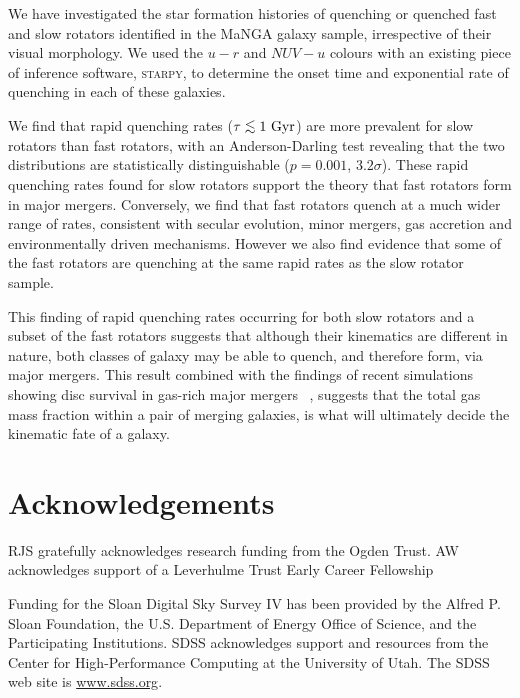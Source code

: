 \documentclass[useAMS,usenatbib]{mn2e}
\def\lesssim{\mathrel{\hbox{\rlap{\hbox{\lower3pt\hbox{$\sim$}}}\hbox{\raise2pt\hbox{$<$}}}}}
\begin{document}
We have investigated the star formation histories of quenching or quenched fast and slow rotators identified in the MaNGA galaxy sample, irrespective of their visual morphology. We used the $u-r$ and $NUV-u$ colours with an existing piece of inference software, \textsc{starpy}, to determine the onset time and exponential rate of quenching in each of these galaxies. 

We find that rapid quenching rates ($\tau \lesssim 1~\rm{Gyr}$) are more prevalent for slow rotators than fast rotators, with an Anderson-Darling test revealing that the two distributions are statistically distinguishable ($p=0.001$, $3.2\sigma$). These rapid quenching rates found for slow rotators support the theory that fast rotators form in major mergers. Conversely, we find that fast rotators quench at a much wider range of rates, consistent with secular evolution, minor mergers, gas accretion and environmentally driven mechanisms. However we also find evidence that some of the fast rotators are quenching at the same rapid rates as the slow rotator sample.

This finding of rapid quenching rates occurring for both slow rotators and a subset of the fast rotators suggests that although their kinematics are different in nature, both classes of galaxy may be able to quench, and therefore form, via major mergers. This result combined with the findings of recent simulations showing disc survival in gas-rich major mergers ~\citep{bois11, pontzen16, sparre16}, suggests that the total gas mass fraction within a pair of merging galaxies, is what will ultimately decide the kinematic fate of a galaxy. 
	
\section*{Acknowledgements}

RJS gratefully acknowledges research funding from the Ogden Trust. AW acknowledges support of a Leverhulme Trust Early Career Fellowship

Funding for the Sloan Digital Sky Survey IV has been provided by the
Alfred P. Sloan Foundation, the U.S. Department of Energy Office of
Science, and the Participating Institutions. SDSS acknowledges
support and resources from the Center for High-Performance Computing at the University of Utah. The SDSS web site is \url{www.sdss.org}.
\end{document}

